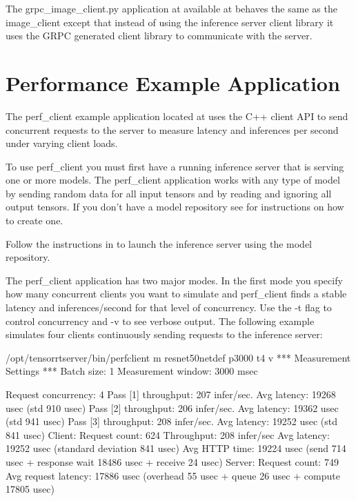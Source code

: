\documentclass[letterpaper,10pt,english]{sphinxmanual}
\begin{document}
The grpc\_image\_client.py application at available at
behaves the same as the image\_client except that instead of using the
inference server client library it uses the GRPC generated client
library to communicate with the server.


\section{Performance Example Application}
\label{\detokenize{client:performance-example-application}}
The perf\_client example application located at
uses the C++ client API to send concurrent requests to the server to
measure latency and inferences per second under varying client loads.

To use perf\_client you must first have a running inference server
that is serving one or more models. The perf\_client application works
with any type of model by sending random data for all input tensors
and by reading and ignoring all output tensors. If you don’t have a
model repository see {\hyperref[\detokenize{run:section-example-model-repository}]{}} for
instructions on how to create one.

Follow the instructions in {\hyperref[\detokenize{run:section-running-the-inference-server}]{}}
to launch the inference server using the model repository.

The perf\_client application has two major modes. In the first mode
you specify how many concurrent clients you want to simulate and
perf\_client finds a stable latency and inferences/second for that
level of concurrency. Use the -t flag to control concurrency and -v
to see verbose output. The following example simulates four clients
continuously sending requests to the inference server:

\begin{sphinxVerbatim}[commandchars=\\\{\}]
\PYGZdl{} /opt/tensorrtserver/bin/perf\PYGZus{}client \PYGZhy{}m resnet50\PYGZus{}netdef \PYGZhy{}p3000 \PYGZhy{}t4 \PYGZhy{}v
*** Measurement Settings ***
  Batch size: 1
  Measurement window: 3000 msec

Request concurrency: 4
  Pass [1] throughput: 207 infer/sec. Avg latency: 19268 usec (std 910 usec)
  Pass [2] throughput: 206 infer/sec. Avg latency: 19362 usec (std 941 usec)
  Pass [3] throughput: 208 infer/sec. Avg latency: 19252 usec (std 841 usec)
  Client:
    Request count: 624
    Throughput: 208 infer/sec
    Avg latency: 19252 usec (standard deviation 841 usec)
    Avg HTTP time: 19224 usec (send 714 usec + response wait 18486 usec + receive 24 usec)
  Server:
    Request count: 749
    Avg request latency: 17886 usec (overhead 55 usec + queue 26 usec + compute 17805 usec)
\end{sphinxVerbatim}
\end{document}
